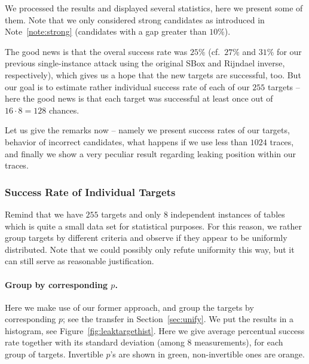 We processed the results and displayed several statistics, here we present some of them. Note that we only considered strong candidates as introduced in Note~\ref{note:strong} (candidates with a gap greater than $10\%$).

The good news is that the overal success rate was $25\%$ (cf.\ $27\%$ and $31\%$ for our previous single-instance attack using the original SBox and Rijndael inverse, respectively), which gives us a hope that the new targets are successful, too. But our goal is to estimate rather individual success rate of each of our $255$ targets -- here the good news is that each target was successful at least once out of $16\cdot8=128$ chances.

Let us give the remarks now -- namely we present success rates of our targets, behavior of incorrect candidates, what happens if we use less than $1024$ traces, and finally we show a very peculiar result regarding leaking position within our traces.

\subsubsection{Success Rate of Individual Targets}
	
	Remind that we have $255$ targets and only $8$ independent instances of tables which is quite a small data set for statistical purposes. For this reason, we rather group targets by different criteria and observe if they appear to be uniformly distributed. Note that we could possibly only refute uniformity this way, but it can still serve as reasonable justification.
	
	\paragraph{Group by corresponding $p$.}
	
	
	Here we make use of our former approach, and group the targets by corresponding $p$; see the transfer in Section~\ref{sec:unify}. We put the results in a histogram, see Figure~\ref{fig:leaktargethist}. Here we give average percentual success rate together with its standard deviation (among $8$ measurements), for each group of targets. Invertible $p$'s are shown in green, non-invertible ones are orange.
	

